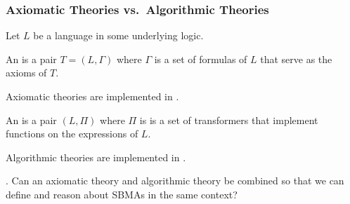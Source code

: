 \documentclass[t,12pt,numbers,fleqn]{beamer}
\begin{document}
\begin{frame}
\frametitle{Axiomatic Theories vs.~Algorithmic Theories}
\bi

  \item Let $L$ be a language in some underlying logic.

  \item An  is a pair $T=(L,\Gamma)$ where
    $\Gamma$ is a set of formulas of $L$ that serve as the axioms of
    $T$.

  \bi

    \item Axiomatic theories are implemented in .

  \ei

\pause

  \item An  is a pair $(L,\Pi)$ where $\Pi$
    is is a set of transformers that implement functions on the
    expressions of $L$.

  \bi

    \item Algorithmic theories are implemented in .

  \ei

\pause

  \item {}.  Can an axiomatic theory and algorithmic
    theory be combined so that we can define and reason about SBMAs in
    the same context?

\pause

  \item {}

\ei
\end{frame}

\end{document}
